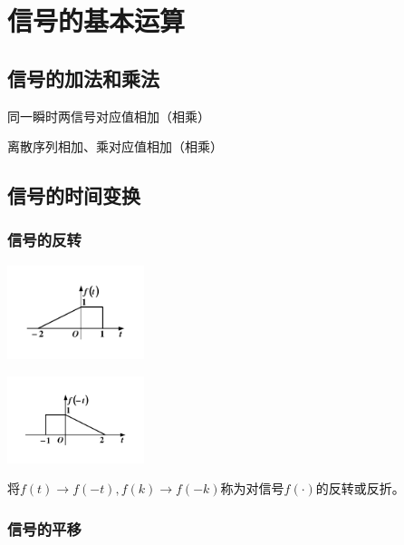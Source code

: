 \section{信号的基本运算}

\subsection{信号的加法和乘法}

同一瞬时两信号对应值相加（相乘）

离散序列相加、乘对应值相加（相乘）

\subsection{信号的时间变换}

\subsubsection{信号的反转}

\begin{Figure}[信号的反转]
    \begin{FigureSub}[反转前原始信号$f(t)$]
        \includegraphics[width=40mm]{visio/1.7-a.pdf}
    \end{FigureSub}
    \begin{FigureSub}[反转信号$f(-t)$]
        \includegraphics[width=40mm]{visio/1.7-b.pdf}
    \end{FigureSub}
\end{Figure}

\begin{BoxDefinition}[信号的反转]
    将$f(t)\rightarrow f(-t),f(k)\rightarrow f(-k)$称为对信号$f(\cdot)$的反转或反折。
\end{BoxDefinition}

\subsubsection{信号的平移}

